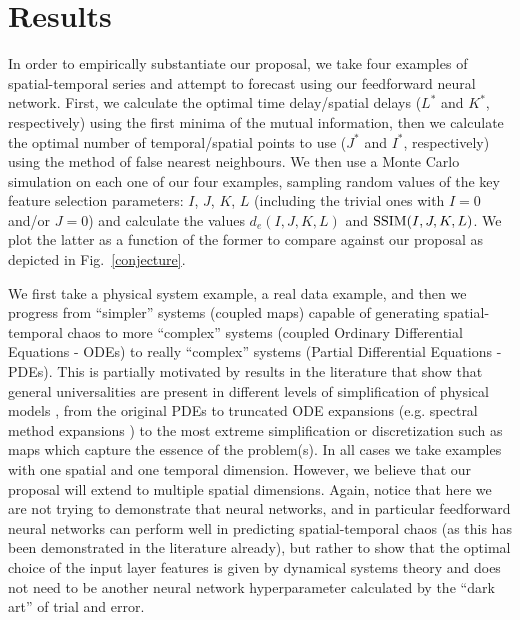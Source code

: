 \documentclass[journal]{IEEEtran}
\begin{document}

\section{Results}
\label{resultssection}

In order to empirically substantiate our proposal, we take four examples of spatial-temporal series and attempt
to forecast using our feedforward neural network. 
First, we calculate the optimal time delay/spatial delays ($L^*$ and $K^*$, respectively)
using the first minima of the mutual information, then we calculate the optimal number of temporal/spatial points to use
($J^*$ and $I^*$, respectively) using the method of false nearest neighbours.
We then use a Monte Carlo simulation on each one of our four examples, sampling random values
of the key feature selection parameters: $I$, $J$, $K$, $L$ (including the trivial ones with $I=0$ and/or $J=0$) 
and calculate the values $d_e(I,J,K,L)$ 
and $\textnormal{SSIM}(I,J,K,L)$.
We plot the latter as a function of the former to compare against our proposal as depicted in Fig.\ \ref{conjecture}.

We first take a physical system example, a real data example, and then we progress from ``simpler'' systems (coupled maps) 
capable of generating 
spatial-temporal chaos to more ``complex'' systems (coupled Ordinary Differential Equations - ODEs) to really ``complex'' systems (Partial 
Differential Equations - PDEs). This is partially motivated by results in the literature that show that general universalities are 
present in different levels of simplification of physical models \cite{2001Chaos..11..404C}, 
from the original PDEs to truncated ODE expansions (e.g. spectral 
method expansions \cite{2001cfsm.book.....B}) to the most extreme simplification or discretization such as maps 
which capture the essence of the problem(s). In all cases we take examples with one spatial and one temporal dimension. 
However, we believe 
that our proposal will extend to multiple spatial dimensions. Again, notice that here we are not trying to demonstrate
that neural networks, and in particular feedforward neural networks can perform well in predicting spatial-temporal chaos
(as this has been demonstrated in the literature already), but 
rather to show that the optimal choice of the input layer features is given by dynamical systems theory and does not need to be
another neural network hyperparameter calculated by the ``dark art'' of trial and error.
\end{document}
